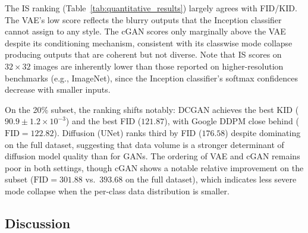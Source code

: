 \documentclass[runningheads]{llncs}
\begin{document}
The IS ranking (Table~\ref{tab:quantitative_results}) largely agrees with FID/KID. The VAE's low score reflects the blurry outputs that the Inception classifier cannot assign to any style. The cGAN scores only marginally above the VAE despite its conditioning mechanism, consistent with its classwise mode collapse producing outputs that are coherent but not diverse. Note that IS scores on $32\times32$ images are inherently lower than those reported on higher-resolution benchmarks (e.g., ImageNet), since the Inception classifier's softmax confidences decrease with smaller inputs.

On the 20\% subset, the ranking shifts notably: DCGAN achieves the best KID ($90.9 \pm 1.2 \times 10^{-3}$) and the best FID ($121.87$), with Google DDPM close behind ($\text{FID}=122.82$). Diffusion (UNet) ranks third by FID ($176.58$) despite dominating on the full dataset, suggesting that data volume is a stronger determinant of diffusion model quality than for GANs. The ordering of VAE and cGAN remains poor in both settings, though cGAN shows a notable relative improvement on the subset ($\text{FID}=301.88$ vs.\ $393.68$ on the full dataset), which indicates less severe mode collapse when the per-class data distribution is smaller.

\subsection{Discussion}\label{sec:discussion}
\end{document}
